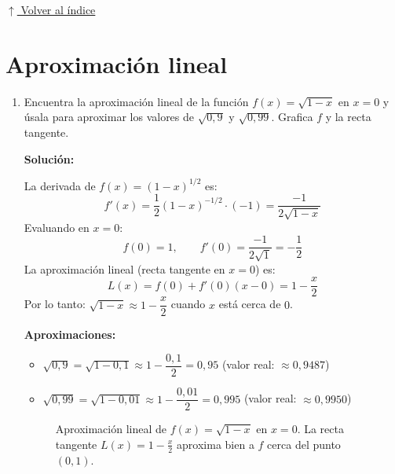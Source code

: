 \documentclass[12pt]{article}
\newcommand{\solucion}{%
    \vspace{0.8em}%
    \textbf{Solución:}%
}
\newcommand{\volverindice}{%
    \vspace{1em}%
    \begin{flushright}%
        \hyperlink{indice}{\small $\uparrow$ Volver al índice}%
    \end{flushright}%
}
\begin{document}
\volverindice
\newpage

\section{Aproximación lineal}

\begin{enumerate}[label=\alph*.-]
    \item Encuentra la aproximación lineal de la función $f(x) = \sqrt{1-x}$ en $x = 0$ y úsala para aproximar los valores de $\sqrt{0{,}9}$ y $\sqrt{0{,}99}$. Grafica $f$ y la recta tangente.

    \solucion

La derivada de $f(x) = (1-x)^{1/2}$ es:
\[
f'(x) = \frac{1}{2}(1-x)^{-1/2} \cdot (-1) = \frac{-1}{2\sqrt{1-x}}
\]
Evaluando en $x = 0$:
\[
f(0) = 1, \qquad f'(0) = \frac{-1}{2\sqrt{1}} = -\frac{1}{2}
\]
La aproximación lineal (recta tangente en $x=0$) es:
\[
L(x) = f(0) + f'(0)(x-0) = 1 - \frac{x}{2}
\]
Por lo tanto: $\sqrt{1-x} \approx 1 - \dfrac{x}{2}$ cuando $x$ está cerca de $0$.

\textbf{Aproximaciones:}
\begin{itemize}
    \item $\sqrt{0{,}9} = \sqrt{1-0{,}1} \approx 1 - \dfrac{0{,}1}{2} = 0{,}95$ \quad (valor real: $\approx 0{,}9487$)
    \item $\sqrt{0{,}99} = \sqrt{1-0{,}01} \approx 1 - \dfrac{0{,}01}{2} = 0{,}995$ \quad (valor real: $\approx 0{,}9950$)
\end{itemize}

\begin{figure}[H]
\centering
{}
\caption{Aproximación lineal de $f(x) = \sqrt{1-x}$ en $x = 0$. La recta tangente $L(x) = 1 - \frac{x}{2}$ aproxima bien a $f$ cerca del punto $(0,1)$.}
\end{figure}
\end{enumerate}
\end{document}
